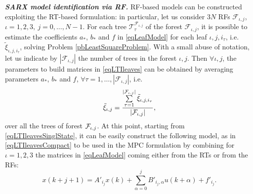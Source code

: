 \textbf{\emph{SARX model identification via RF.}} RF-based models can be constructed exploiting the RT-based formulation: in particular, let us consider $3 N$ RFs $\mathcal{F}_{\iota,j}$, $\iota = 1,2,3,\ j = 0,\ldots,N-1$. 
For each tree $\mathcal{T}^{\mathcal{F}_{\iota,j}}_\tau$ of the forest $\mathcal{F}_{\iota,j}$, it is possible to estimate the coefficients $a_*$, $b_*$ and $f$ in \eqref{eqLeafModel} for each leaf $\iota,j,i_\tau$, i.e. $\tilde\xi_{\iota,j,i_\tau}$, solving Problem \ref{pbLeastSquareProblem}.
With a small abuse of notation, let us indicate by $|\mathcal{F}_{\iota,j}|$ the number of trees in the forest ${\iota,j}$. 
Then $\forall \iota,j$, the parameters to build matrices in \eqref{eqLTIleaves} can be obtained by averaging parameters $a_*$, $b_*$ and $f$, $\forall \tau = 1,\ldots,|\mathcal{F}_{\iota,j}|$, i.e.
\small
\begin{equation}\label{eqAverageRF}
\tilde\xi_{\iota,j} = \frac{\sum\limits_{\tau=1}^{|\mathcal{F}_{\iota,j}|}\tilde\xi_{\iota,j,i_\tau}}{|\mathcal{F}_{\iota,j}|},
\end{equation}
\normalsize
over all the trees of forest $\mathcal{F}_{\iota,j}$. At this point, starting from \eqref{eqLTIleavesSinglState}, it can be easily construct the following model, as in \eqref{eqLTIleavesCompact} to be used in the MPC formulation by combining for $\iota=1,2,3$ the matrices in \eqref{eqLeafModel} coming either from the RTs or from the RFs:
\small
\begin{equation}\label{eqLTIleaves}
	x(k+j+1) = A'_{i_j}x(k) + \sum_{\alpha = 0}^{j}{B'_{i_j,\alpha}u(k+\alpha)} + f'_{i_j}.
\end{equation}
\normalsize


